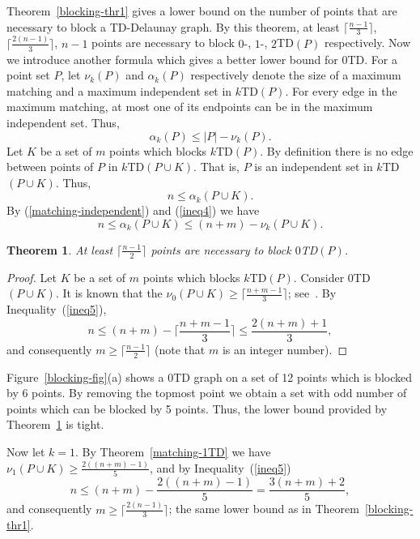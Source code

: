 \documentclass[11pt,a4paper]{article}
\newcommand{\kTD}[2]{$#1$\text{-}TD#2}
\newtheorem{theorem}{Theorem}
\begin{document}
Theorem~\ref{blocking-thr1} gives a lower bound on the number of points that are necessary to block a TD-Delaunay graph. By this theorem, at least $\lceil\frac{n-1}{3}\rceil$, $\lceil\frac{2(n-1)}{3}\rceil$, $n-1$ points are necessary to block $0\text{-}$, $1\text{-}$, \kTD{2}{$(P)$} respectively. Now we introduce another formula which gives a better lower bound for \kTD{0}{}. For a point set $P$, let $\nu_k(P)$ and $\alpha_k(P)$ respectively denote the size of a maximum matching and a maximum independent set in \kTD{k}{$(P)$}. For every edge in the maximum matching, at most one of its endpoints can be in the maximum independent set. Thus,
\begin{equation}
\label{matching-independent}
 \alpha_k(P)\le |P| - \nu_k(P).
\end{equation}
Let $K$ be a set of $m$ points which blocks \kTD{k}{$(P)$}. By definition there is no edge between points of $P$ in \kTD{k}{$(P\cup K)$}. That is, $P$ is an independent set in \kTD{k}{$(P\cup K)$}. Thus, 
\begin{equation}
\label{ineq4}
 n\le \alpha_k(P\cup K).
\end{equation}
By (\ref{matching-independent}) and (\ref{ineq4}) we have
\begin{equation}
\label{ineq5}
 n\le \alpha_k(P\cup K)\le (n+m)-\nu_k(P\cup K).
\end{equation}
\begin{theorem}
\label{blocking-0TD-thr}
  At least $\lceil\frac{n-1}{2}\rceil$ points are necessary to block \kTD{0}{$(P)$}.
\end{theorem}
\begin{proof}
Let $K$ be a set of $m$ points which blocks \kTD{k}{$(P)$}. Consider \kTD{0}{$(P\cup K)$}. It is known that the $\nu_0(P\cup K) \ge\lceil\frac{n+m-1}{3}\rceil$; see~\cite{Babu2013}. By Inequality~(\ref{ineq5}), $$n\le (n+m)-\lceil\frac{n+m-1}{3}\rceil\le \frac{2(n+m)+1}{3},$$ and consequently $m\ge \lceil\frac{n-1}{2}\rceil$ (note that $m$ is an integer number).
\end{proof}

Figure~\ref{blocking-fig}(a) shows a \kTD{0}{} graph on a set of 12 points which is blocked by 6 points. By removing the topmost point we obtain a set with odd number of points which can be blocked by 5 points. Thus, the lower bound provided by Theorem~\ref{blocking-0TD-thr} is tight. 

Now let $k=1$. By Theorem~\ref{matching-1TD} we have $\nu_1(P\cup K)\ge \frac{2((n+m)-1)}{5}$, and by Inequality~(\ref{ineq5}) $$n\le (n+m)-\frac{2((n+m)-1)}{5}=\frac{3(n+m)+2}{5},$$ and consequently $m\ge \lceil\frac{2(n-1)}{3}\rceil$; the same lower bound as in Theorem~\ref{blocking-thr1}. 
\end{document}
